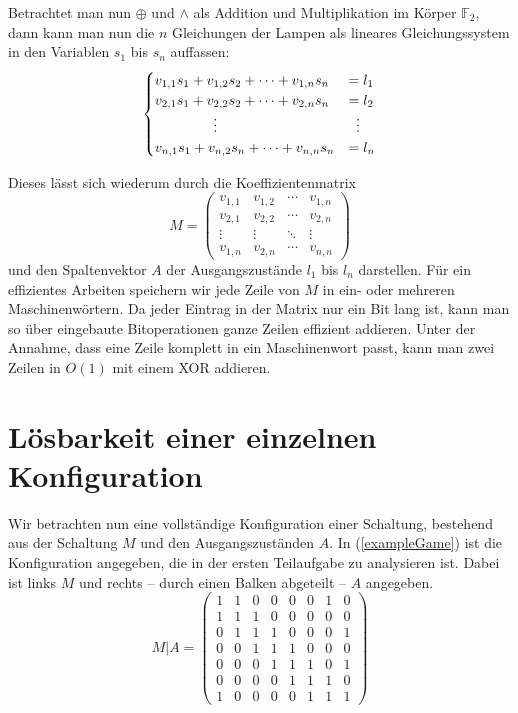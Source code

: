 \documentclass{scrartcl}
\newcommand{\ftwo}{\ensuremath{\mathbb F_2}}
\newcommand{\bigO}{O}
\newcommand{\xor}{\oplus}
\begin{document}
Betrachtet man nun $\xor$ und $\land$ als Addition und Multiplikation im Körper
\ftwo, dann kann man nun die $n$ Gleichungen der Lampen als lineares
Gleichungssystem in den Variablen $s_1$ bis $s_n$ auffassen:
\begin{equation}
\begin{cases}
  v_{1,1}s_1+v_{1,2}s_2+\dots+v_{1,n}s_n&=l_1\\
  v_{2,1}s_1+v_{2,2}s_2+\dots+v_{2,n}s_n&=l_2\\
  \hfil\vdots\hfil&\hfil\vdots\hfil\\
  v_{n,1}s_1+v_{n,2}s_n+\dots+v_{n,n}s_n&=l_n\\
\end{cases}
\end{equation}

Dieses lässt sich wiederum durch die Koeffizientenmatrix
\begin{equation}
M=
\begin{pmatrix}
  v_{1,1}&v_{1,2}&\cdots&v_{1,n}\\
  v_{2,1}&v_{2,2}&\cdots&v_{2,n}\\
  \vdots &\vdots &\ddots&\vdots\\
  v_{1,n}&v_{2,n}&\cdots&v_{n,n}
\end{pmatrix}
\end{equation}
und den Spaltenvektor $A$ der Ausgangszustände $l_1$ bis $l_n$ darstellen. Für
ein effizientes Arbeiten speichern wir jede Zeile von $M$ in ein- oder mehreren
Maschinenwörtern. Da jeder Eintrag in der Matrix nur ein Bit lang ist, kann man
so über eingebaute Bitoperationen ganze Zeilen effizient addieren. Unter der
Annahme, dass eine Zeile komplett in ein Maschinenwort passt, kann man zwei
Zeilen in $\bigO(1)$ mit einem XOR addieren.

\section{Lösbarkeit einer einzelnen Konfiguration}
\label{singleConf}
Wir betrachten nun eine vollständige Konfiguration einer Schaltung, bestehend
aus der Schaltung $M$ und den Ausgangszuständen $A$. In (\ref{exampleGame}) ist
die Konfiguration angegeben, die in der ersten Teilaufgabe zu analysieren ist.
Dabei ist links $M$ und rechts -- durch einen Balken abgeteilt -- $A$ angegeben.
\begin{equation}
M\vert A=\left(
\begin{array}{ccccccc|c}
  1&1&0&0&0&0&1&0\\
  1&1&1&0&0&0&0&0\\
  0&1&1&1&0&0&0&1\\
  0&0&1&1&1&0&0&0\\
  0&0&0&1&1&1&0&1\\
  0&0&0&0&1&1&1&0\\
  1&0&0&0&0&1&1&1 
\end{array}\right)\label{exampleGame}
\end{equation}
\end{document}
